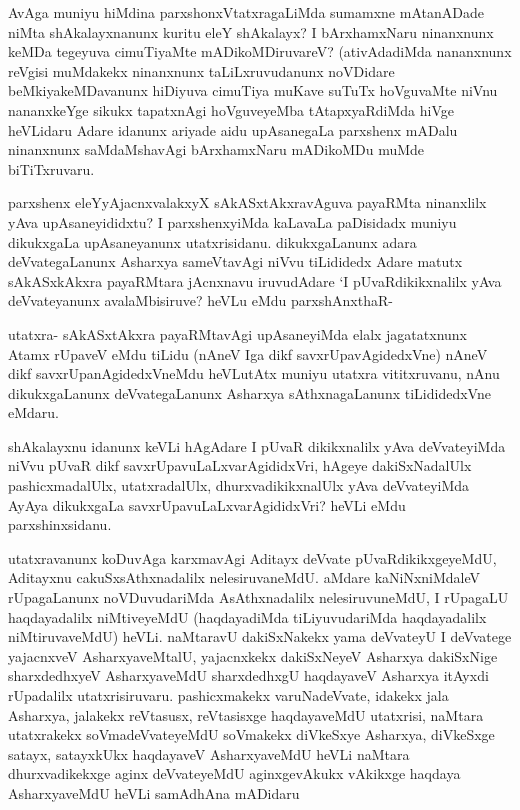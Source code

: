 
\begin{artha}
AvAga muniyu hiMdina parxshonxVtatxragaLiMda sumamxne mAtanADade niMta shAkalayxnanunx kuritu eleY shAkalayx? I bArxhamxNaru ninanxnunx keMDa tegeyuva cimuTiyaMte mADikoMDiruvareV? (ativAdadiMda nananxnunx reVgisi muMdakekx ninanxnunx taLiLxruvudanunx noVDidare beMkiyakeMDavanunx hiDiyuva cimuTiya muKave suTuTx hoVguvaMte niVnu nananxkeYge sikukx tapatxnAgi hoVguveyeMba tAtapxyaRdiMda hiVge heVLidaru Adare idanunx ariyade aidu upAsanegaLa parxshenx mADalu ninanxnunx saMdaMshavAgi bArxhamxNaru mADikoMDu muMde biTiTxruvaru. 
\end{artha}

\begin{artha}
parxshenx eleYyAjacnxvalakxyX sAkASxtAkxravAguva payaRMta ninanxlilx yAva upAsaneyididxtu? I parxshenxyiMda kaLavaLa paDisidadx muniyu dikukxgaLa upAsaneyanunx utatxrisidanu.  dikukxgaLanunx adara deVvategaLanunx Asharxya sameVtavAgi niVvu tiLididedx Adare matutx sAkASxkAkxra payaRMtara jAcnxnavu iruvudAdare `I pUvaRdikikxnalilx yAva deVvateyanunx avalaMbisiruve? heVLu eMdu parxshAnxthaR-
\end{artha}

\begin{artha}
utatxra- sAkASxtAkxra payaRMtavAgi upAsaneyiMda elalx jagatatxnunx Atamx rUpaveV eMdu tiLidu (nAneV Iga dikf savxrUpavAgidedxVne) nAneV dikf savxrUpanAgidedxVneMdu heVLutAtx muniyu utatxra vititxruvanu, nAnu dikukxgaLanunx deVvategaLanunx Asharxya sAthxnagaLanunx tiLididedxVne eMdaru. 
\end{artha}

\begin{artha}%
shAkalayxnu idanunx keVLi hAgAdare I pUvaR dikikxnalilx yAva deVvateyiMda niVvu pUvaR dikf savxrUpavuLaLxvarAgididxVri, hAgeye dakiSxNadalUlx pashicxmadalUlx, utatxradalUlx, dhurxvadikikxnalUlx yAva deVvateyiMda AyAya dikukxgaLa savxrUpavuLaLxvarAgididxVri? heVLi eMdu parxshinxsidanu.  
\end{artha}

\begin{artha}
utatxravanunx koDuvAga karxmavAgi Aditayx deVvate pUvaRdikikxgeyeMdU, Aditayxnu cakuSxsAthxnadalilx nelesiruvaneMdU. aMdare kaNiNxniMdaleV rUpagaLanunx noVDuvudariMda AsAthxnadalilx nelesiruvuneMdU, I rUpagaLU haqdayadalilx niMtiveyeMdU (haqdayadiMda tiLiyuvudariMda haqdayadalilx niMtiruvaveMdU) heVLi. naMtaravU dakiSxNakekx yama deVvateyU I deVvatege yajacnxveV AsharxyaveMtalU, yajacnxkekx dakiSxNeyeV Asharxya dakiSxNige sharxdedhxyeV AsharxyaveMdU sharxdedhxgU haqdayaveV Asharxya itAyxdi rUpadalilx utatxrisiruvaru. pashicxmakekx varuNadeVvate, idakekx jala Asharxya, jalakekx reVtasusx, reVtasisxge haqdayaveMdU utatxrisi, naMtara utatxrakekx soVmadeVvateyeMdU soVmakekx diVkeSxye Asharxya, diVkeSxge satayx, satayxkUkx haqdayaveV AsharxyaveMdU heVLi naMtara dhurxvadikekxge aginx deVvateyeMdU aginxgevAkukx vAkikxge haqdaya AsharxyaveMdU heVLi samAdhAna mADidaru
\end{artha}

